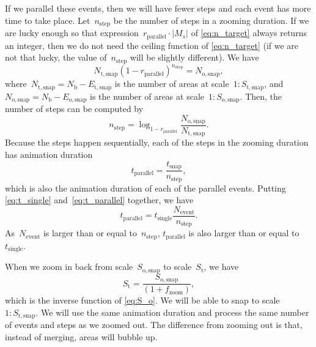 \documentclass[]{interact}
\begin{document}
If we parallel these events, 
then we will have fewer steps and 
each event has more time to take place.
Let~$n_\mathrm{step}$ be the number of steps in a zooming duration.
If we are lucky enough so that
expression~$r_\mathrm{parallel} \cdot |M_s|$ of \eq\ref{eq:n_target}
always returns an integer, 
then we do not need the ceiling function of \eq\ref{eq:n_target}
(if we are not that lucky, the value of~$n_\mathrm{step}$ will be slightly different).
We have 
\begin{equation*}
N_\mathrm{t,snap} (1-r_\mathrm{parallel})^{n_\mathrm{step}} = N_\mathrm{o,snap},
\end{equation*}
where~$N_\mathrm{t,snap} = N_\mathrm{b}- E_\mathrm{t,snap}$ 
is the number of areas at scale~$1:S_\mathrm{t,snap}$,
and~$N_\mathrm{o,snap} = N_\mathrm{b}- E_\mathrm{o,snap}$
is the number of areas at scale~$1:S_\mathrm{o,snap}$.
Then, the number of steps can be computed by
\begin{equation*}
n_\mathrm{step} = \log_{1-r_\mathrm{parallel}} 
    \frac{N_\mathrm{o,snap}}{N_\mathrm{t,snap}}.
\end{equation*}
Because the steps happen sequentially,
each of the steps in the zooming duration has
animation duration
\begin{equation}
\label{eq:t_parallel}
t_\mathrm{parallel} = \frac{t_\mathrm{snap}}{n_\mathrm{step}},
\end{equation}
which is also the animation duration of each of the parallel events.
Putting \eqs\ref{eq:t_single} and~\ref{eq:t_parallel} together,
we have
\begin{equation*}
\label{eq:t_compare}
t_\mathrm{parallel} = t_\mathrm{single}  \frac{N_\mathrm{event}}{n_\mathrm{step}}.
\end{equation*}
As~$N_\mathrm{event}$ is larger than or equal to~$n_\mathrm{step}$,
$t_\mathrm{parallel}$ is also larger than or equal to~$t_\mathrm{single}$.


When we zoom in back from scale~$S_\mathrm{o,snap}$ to scale~$S_\mathrm{t}$, 
we have
\begin{equation*}
\label{eq:S_i}
S_\mathrm{t} = \frac{S_\mathrm{o,snap}}{(1 + f_\mathrm{zoom})},
\end{equation*}
which is the inverse function of \eq\ref{eq:S_o}.
We will be able to snap to scale~$1:S_\mathrm{t,snap}$.
We will use the same animation duration and 
process the same number of events and steps as we zoomed out.
The difference from zooming out is that, instead of merging, 
areas will bubble up.
\end{document}
